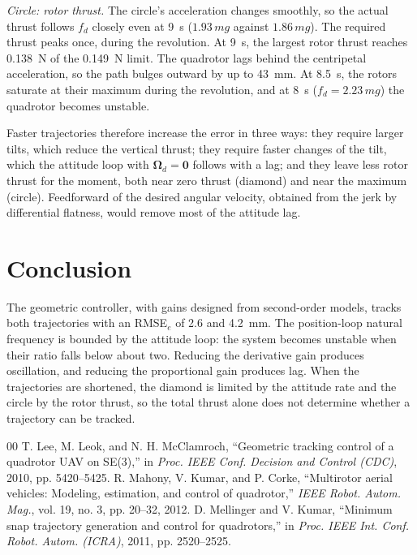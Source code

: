 \documentclass[conference]{IEEEtran}
\newcommand{\Om}{\boldsymbol{\Omega}}
\begin{document}
\emph{Circle: rotor thrust.} The circle's acceleration changes smoothly, so
the actual thrust follows $f_d$ closely even at 9~s ($1.93\,mg$ against
$1.86\,mg$). The required thrust peaks once, during the revolution. At 9~s,
the largest rotor thrust reaches 0.138~N of the 0.149~N limit. The
quadrotor lags behind the centripetal acceleration, so the path bulges
outward by up to 43~mm. At 8.5~s, the rotors saturate at their maximum
during the revolution, and at 8~s ($f_d=2.23\,mg$) the quadrotor becomes
unstable.

Faster trajectories therefore increase the error in three ways: they require
larger tilts, which reduce the vertical thrust; they require faster changes
of the tilt, which the attitude loop with $\Om_d=\mathbf 0$ follows with a
lag; and they leave less rotor thrust for the moment, both near zero thrust
(diamond) and near the maximum (circle). Feedforward of the desired angular
velocity, obtained from the jerk by differential flatness, would remove most
of the attitude lag.

\section{Conclusion}
The geometric controller, with gains designed from second-order models,
tracks both trajectories with an RMSE$_e$ of 2.6 and 4.2~mm. The
position-loop natural frequency is bounded by the attitude loop: the system
becomes unstable when their ratio falls below about two. Reducing the
derivative gain produces oscillation, and reducing the proportional gain
produces lag. When the trajectories are shortened, the diamond is limited by
the attitude rate and the circle by the rotor thrust, so the total thrust
alone does not determine whether a trajectory can be tracked.

\begin{thebibliography}{00}
 T. Lee, M. Leok, and N. H. McClamroch, ``Geometric tracking
control of a quadrotor UAV on SE(3),'' in \textit{Proc. IEEE Conf. Decision
and Control (CDC)}, 2010, pp. 5420--5425.
 R. Mahony, V. Kumar, and P. Corke, ``Multirotor aerial
vehicles: Modeling, estimation, and control of quadrotor,'' \textit{IEEE
Robot. Autom. Mag.}, vol. 19, no. 3, pp. 20--32, 2012.
 D. Mellinger and V. Kumar, ``Minimum snap trajectory
generation and control for quadrotors,'' in \textit{Proc. IEEE Int. Conf.
Robot. Autom. (ICRA)}, 2011, pp. 2520--2525.
\end{thebibliography}
\end{document}
